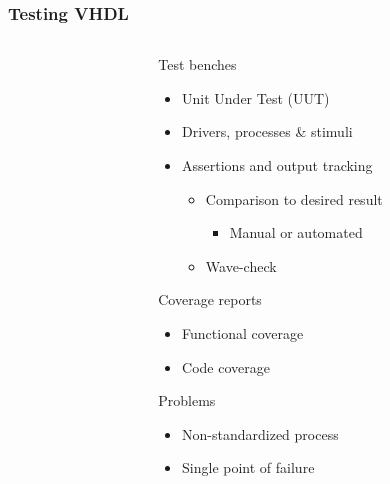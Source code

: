 \documentclass[british,10pt]{beamer}
\begin{document}
\begin{frame}\frametitle{Testing VHDL}
\begin{columns}
\begin{column}{0.05\textwidth}
\end{column}
\begin{column}{0.55\textwidth}
Test benches
\begin{itemize}
\item Unit Under Test (UUT)
\item Drivers, processes \& stimuli
\item Assertions and output tracking
\begin{itemize}
\item Comparison to desired result
\begin{itemize}
\item Manual or automated
\end{itemize}
\item Wave-check
\end{itemize}
\end{itemize}
Coverage reports
\begin{itemize}
\item Functional coverage
\item Code coverage
\end{itemize}
\vspace{0.25cm}
Problems
\begin{itemize}
\item Non-standardized process
\item Single point of failure
\end{itemize}
\end{column}
\raggedleft

\end{columns}
\end{frame}
\end{document}
